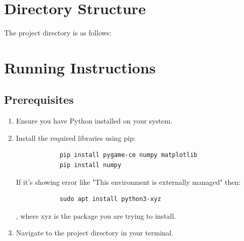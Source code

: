 \documentclass[12pt]{article}
\begin{document}
\section{Directory Structure}
    The project directory is as follows:


    

\section{Running Instructions}
    \subsection{Prerequisites}
    \begin{enumerate}
        \item Ensure you have Python installed on your system.
        \item Install the required libraries using pip:
        \begin{verbatim}
            pip install pygame-ce numpy matplotlib
            pip install numpy
        \end{verbatim}
        If it's showing error like "This environment is externally managed" then:
        \begin{verbatim}
            sudo apt install python3-xyz
        \end{verbatim}
        , where xyz is the package you are trying to install.
        \item Navigate to the project directory in your terminal.
        
        \end{enumerate} 
\end{document}
